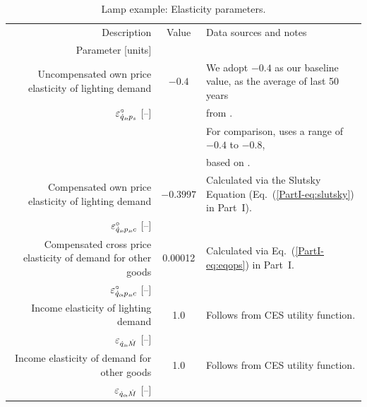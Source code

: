\documentclass[12pt]{article}\usepackage[]{graphicx}\usepackage[]{xcolor}
\begin{document}
\begin{landscape}
\begin{table}
\footnotesize
\begin{center}
\caption{Lamp example: Elasticity parameters.}
\label{tab:lamp_elasticity_parameters}
\begin{tabular}{ r c l }
  \toprule
  Description & Value & Data sources and notes \\
  Parameter [units] & & \\
  \midrule
  Uncompensated own price elasticity of lighting demand  &   $-0.4$  & We adopt $-0.4$ as our baseline value, as the average of last 50 years \\
  $\varepsilon^\circ_{\dot{q}_s\!,p_s}$ [--]                                                             &           &   from \citet[Fig.~4]{Fouquet2014}. \\
                                                            &           &  For comparison, \citet{Borenstein:2015aa} uses a range of $-0.4$ to $-0.8$, \\
                                                            &            &     based on \citet{Fouquet2011}. \\
  \midrule
  Compensated own price elasticity of lighting demand                 &  $-0.3997$      & Calculated via the Slutsky Equation (Eq.~(\ref{PartI-eq:slutsky}) in Part~I).  \\
  $\varepsilon^\circ_{\dot{q}_s\!,p_s\!,c}$ [--]                                           &           &   \\
  \midrule
  Compensated cross price elasticity of demand for other goods        &   0.00012     & Calculated via Eq.~(\ref{PartI-eq:eqops}) in Part~I.  \\
  $\varepsilon^\circ_{\dot{q}_o\!,p_s\!,c}$ [--]                                           &           &   \\
  \midrule
  Income elasticity of lighting demand                    &   1.0     & Follows from CES utility function. \\
  $\varepsilon_{\dot{q}_s\!,\dot{M}}$ [--]                                            &           &   \\
  \midrule
  Income elasticity of demand for other goods             &   1.0     & Follows from CES utility function. \\
  $\varepsilon_{\dot{q}_o\!,\dot{M}}$ [--]                                            &           &   \\
  \bottomrule
\end{tabular}
\end{center}
\end{table}
\end{landscape}
\end{document}

